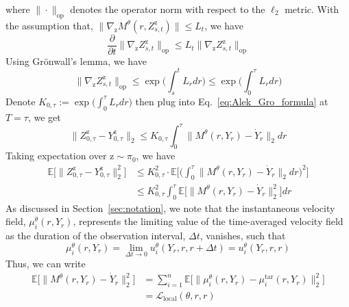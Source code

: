 \documentclass{article}
\begin{document}
where $\|\cdot \|_{\text{op}}$ denotes the operator norm with respect to the $\ell_2$ metric. With the assumption that, $\| \nabla_{\mathrm{z}} M^{\theta}(r, Z^{\mathrm{z}}_{s,t})\| \leq L_t$, we have 
\begin{equation}
   \frac{\partial}{\partial t} \|\nabla_{\mathrm{z}}  Z^{\mathrm{z}}_{s,t}\|_{\text{op}} \leq L_t \|\nabla_{\mathrm{z}}  Z^{\mathrm{z}}_{s,t}\|_{\text{op}} \label{eq:norm_leq_Lt}
\end{equation}
Using Grönwall’s lemma, we have 
\begin{equation}
    \|\nabla_{\mathrm{z}}  Z^{\mathrm{z}}_{s,t}\|_{\text{op}} \leq \exp\Big(\int^t_s L_r dr \Big) \leq \exp\Big(\int^\tau_0 L_r dr \Big)
\end{equation}
Denote $K_{0, \tau}:= \exp\Big(\int^\tau_0 L_r dr \Big)$ then plug into Eq.~\ref{eq:Alek_Gro_formula} at $T=\tau$, we get
\begin{equation}
    \|Z^{\mathrm{z}}_{0,\tau}  - Y^{\mathrm{z}}_{0,\tau}\|_2 \leq K_{0, \tau} \int_{0}^{\tau} \|M^{\theta}(r, Y_r) - \dot{Y}_{r} \|_2 dr
\end{equation}
Taking expectation over $\mathrm{z} \sim \pi_0$, we have 
\begin{align}
    \mathbb{E}\big[ \| Z^{\mathrm{z}}_{0, \tau}  - Y^{\mathrm{z}}_{0, \tau}\|_2^2\big] &\leq K^2_{0, \tau} \cdot\mathbb{E} \Big[\Big( \int_{0}^{\tau} \|M^{\theta}(r, Y_r) - \dot{Y}_{r} \|_2 dr\Big)^2 \Big]  \\
    &\leq K_{0, \tau}^2 \int_{0}^\tau \mathbb{E} \Big[\|M^{\theta}(r, Y_r) - \dot{Y}_{r} \|^2_2 \Big] dr \label{eq:error_bound_raw}
\end{align}
As discussed in Section~\ref{sec:notation}, we note that the instantaneous velocity field, $\mu^{\theta}_i(r, Y_r)$, represents the limiting value of the time-averaged velocity field as the duration of the observation interval, $\Delta t$, vanishes, such that 
\begin{equation}
    \mu^{\theta}_i(r, Y_r) =\lim_{\Delta t \to 0} u^{\theta}_i (Y_r, r, r + \Delta t) = u^{\theta}_i(Y_r, r, r )  
\end{equation}
Thus, we can write 
\begin{align}
    \mathbb{E} \Big[\|M^{\theta}(r, Y_r) - \dot{Y}_{r} \|^2_2 \Big] &= \sum_{i=1}^{n} \mathbb{E} \Big[\|\mu_i^{\theta}(r, Y_r) -  \mu_i^{\text{tar}}(r, Y_r)\|^2_2 \Big] \\
    &= \mathcal{L}_{\text{local}}(\theta, r, r) \label{eq:relate_to_local_loss}
\end{align}
\end{document}

